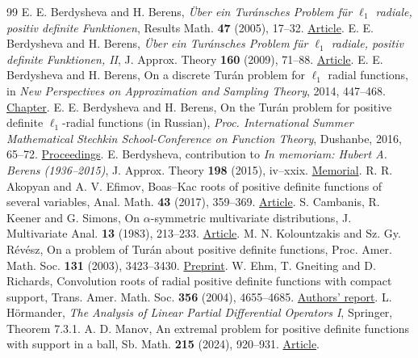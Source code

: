 \documentclass[11pt,a4paper]{article}
\numberwithin{equation}{section}
\begin{document}
\begin{thebibliography}{99}
 E. E. Berdysheva and H. Berens, \emph{\"Uber ein Tur\'ansches Problem f\"ur $\ell_1$ radiale, positiv definite Funktionen}, Results Math. \textbf{47} (2005), 17--32. \href{https://doi.org/10.1007/BF03323009}{Article}.
 E. E. Berdysheva and H. Berens, \emph{\"Uber ein Tur\'ansches Problem f\"ur $\ell_1$ radiale, positiv definite Funktionen, II}, J. Approx. Theory \textbf{160} (2009), 71--88. \href{https://doi.org/10.1016/j.jat.2008.01.009}{Article}.
 E. E. Berdysheva and H. Berens, On a discrete Tur\'an problem for $\ell_1$ radial functions, in \emph{New Perspectives on Approximation and Sampling Theory}, 2014, 447--468. \href{https://doi.org/10.1007/978-3-319-08801-3_19}{Chapter}.
 E. E. Berdysheva and H. Berens, On the Tur\'an problem for positive definite $\ell_1$-radial functions (in Russian), \emph{Proc. International Summer Mathematical Stechkin School-Conference on Function Theory}, Dushanbe, 2016, 65--72. \href{https://ir.duan.edu.ua/server/api/core/bitstreams/fdaadc5f-8619-438f-a679-98a574d5aaca/content}{Proceedings}.
 E. Berdysheva, contribution to \emph{In memoriam: Hubert A. Berens (1936--2015)}, J. Approx. Theory \textbf{198} (2015), iv--xxix. \href{https://history-of-approximation-theory.com/fpapers/berens.pdf}{Memorial}.
 R. R. Akopyan and A. V. Efimov, Boas--Kac roots of positive definite functions of several variables, Anal. Math. \textbf{43} (2017), 359--369. \href{https://doi.org/10.1007/s10476-017-0202-9}{Article}.
 S. Cambanis, R. Keener and G. Simons, On $\alpha$-symmetric multivariate distributions, J. Multivariate Anal. \textbf{13} (1983), 213--233. \href{https://doi.org/10.1016/0047-259X(83)90023-4}{Article}.
 M. N. Kolountzakis and Sz. Gy. R\'ev\'esz, On a problem of Tur\'an about positive definite functions, Proc. Amer. Math. Soc. \textbf{131} (2003), 3423--3430. \href{https://arxiv.org/abs/math/0204086}{Preprint}.
 W. Ehm, T. Gneiting and D. Richards, Convolution roots of radial positive definite functions with compact support, Trans. Amer. Math. Soc. \textbf{356} (2004), 4655--4685. \href{https://stat.uw.edu/research/tech-reports/convolution-roots-radial-positive-definite-functions-compact-support}{Authors' report}.
 L. H\"ormander, \emph{The Analysis of Linear Partial Differential Operators I}, Springer, Theorem 7.3.1.
 A. D. Manov, An extremal problem for positive definite functions with support in a ball, Sb. Math. \textbf{215} (2024), 920--931. \href{https://www.mathnet.ru/eng/sm10006}{Article}.

\end{thebibliography}
\end{document}
